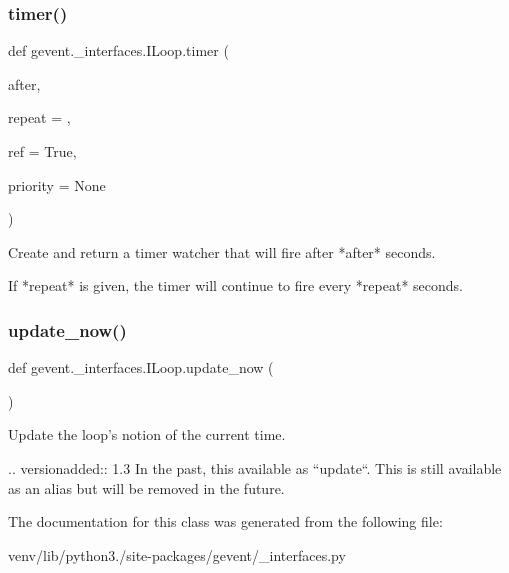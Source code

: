 \subsubsection{\texorpdfstring{timer()}{timer()}}
{\footnotesize\ttfamily def gevent.\+\_\+interfaces.\+I\+Loop.\+timer (\begin{DoxyParamCaption}\item[{}]{after,  }\item[{}]{repeat = {},  }\item[{}]{ref = {\ttfamily True},  }\item[{}]{priority = {\ttfamily None} }\end{DoxyParamCaption})}

\begin{DoxyVerb}Create and return a timer watcher that will fire after *after* seconds.

If *repeat* is given, the timer will continue to fire every *repeat* seconds.
\end{DoxyVerb}
 \mbox{\label{classgevent_1_1__interfaces_1_1_i_loop_ac25c25cd6fc59358ceb64c26b88dc556}} 
\subsubsection{\texorpdfstring{update\+\_\+now()}{update\_now()}}
{\footnotesize\ttfamily def gevent.\+\_\+interfaces.\+I\+Loop.\+update\+\_\+now (\begin{DoxyParamCaption}{ }\end{DoxyParamCaption})}

\begin{DoxyVerb}Update the loop's notion of the current time.

.. versionadded:: 1.3
   In the past, this available as ``update``. This is still available as
   an alias but will be removed in the future.
\end{DoxyVerb}
 

The documentation for this class was generated from the following file\+:\begin{DoxyCompactItemize}
\item 
venv/lib/python3./site-\/packages/gevent/\+\_\+interfaces.\+py\end{DoxyCompactItemize}
